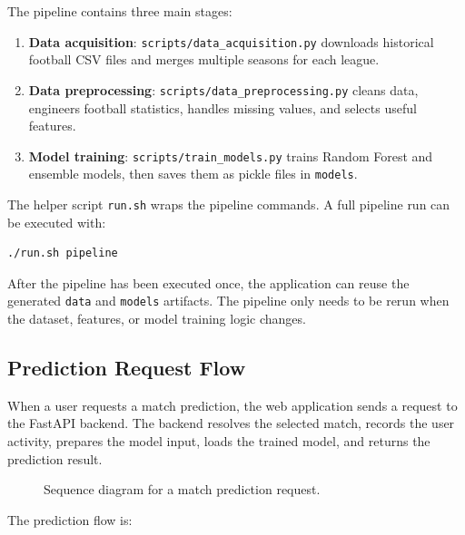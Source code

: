 The pipeline contains three main stages:

\begin{enumerate}
    \item \textbf{Data acquisition}: \texttt{scripts/data\_acquisition.py} downloads historical football CSV files and merges multiple seasons for each league.
    \item \textbf{Data preprocessing}: \texttt{scripts/data\_preprocessing.py} cleans data, engineers football statistics, handles missing values, and selects useful features.
    \item \textbf{Model training}: \texttt{scripts/train\_models.py} trains Random Forest and ensemble models, then saves them as pickle files in \texttt{models}.
\end{enumerate}

The helper script \texttt{run.sh} wraps the pipeline commands. A full pipeline run can be executed with:

\begin{verbatim}
./run.sh pipeline
\end{verbatim}

After the pipeline has been executed once, the application can reuse the generated \texttt{data} and \texttt{models} artifacts. The pipeline only needs to be rerun when the dataset, features, or model training logic changes.

\subsection{Prediction Request Flow}
\label{subsec:prediction-request-flow}

When a user requests a match prediction, the web application sends a request to the FastAPI backend. The backend resolves the selected match, records the user activity, prepares the model input, loads the trained model, and returns the prediction result.

\begin{figure}[htbp]
    \centering
    \caption{Sequence diagram for a match prediction request.}
    \label{fig:prediction-sequence}
\end{figure}

The prediction flow is:


